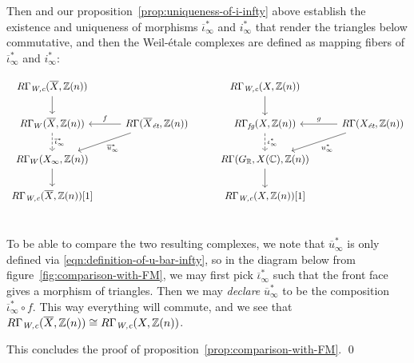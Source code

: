 \documentclass{article}
\numberwithin{equation}{section}
\begin{document}
Then \cite[Proposition~3.24]{Flach-Morin-2018} and our
proposition~\ref{prop:uniqueness-of-i-infty} above establish the existence and
uniqueness of morphisms $\overline{\iota}_\infty^*$ and $i_\infty^*$ that render
the triangles below commutative, and then the Weil-étale complexes are defined
as mapping fibers of $\overline{\iota}_\infty^*$ and $i_\infty^*$:

\[ \begin{tikzcd}
    R\Gamma_\Wc (\overline{X}, \ZZ (n))\ar{d} & & R\Gamma_\Wc (X, \ZZ (n))\ar{d} \\
    R\Gamma_W (\overline{X}, \ZZ(n)) \ar[dashed]{d}{\overline{\iota}_\infty^*} & R\Gamma (\overline{X}_\et, \ZZ(n)) \ar{dl}{\overline{u}_\infty^*}\ar{l}[swap]{f} & R\Gamma_\fg (X, \ZZ(n))  \ar[dashed]{d}{\iota_\infty^*} & R\Gamma (X_\et, \ZZ(n)) \ar{dl}{u_\infty^*}\ar{l}[swap]{g} \\
    R\Gamma_W (X_\infty, \ZZ (n))\ar{d} & & R\Gamma (G_\RR, X (\CC), \ZZ (n))\ar{d} \\
    R\Gamma_\Wc (\overline{X}, \ZZ (n))[1] & & R\Gamma_\Wc (X, \ZZ (n))[1] \\
  \end{tikzcd} \]

To be able to compare the two resulting complexes, we note that
$\overline{u}_\infty^*$ is only defined via
\eqref{eqn:definition-of-u-bar-infty}, so in the diagram below from
figure~\ref{fig:comparison-with-FM}, we may first pick
$\overline{\iota}_\infty^*$ such that the front face gives a morphism of
triangles. Then we may \emph{declare} $\overline{u}_\infty^*$ to be the
composition $\overline{\iota}_\infty^* \circ f$. This way everything will
commute, and we see that
$R\Gamma_{\text{\it W,c}} (\overline{X}, \mathbb{Z}(n)) \cong R\Gamma_{\text{\it W,c}} (X, \mathbb{Z}(n))$.

\vspace{1em}

This concludes the proof of proposition~\ref{prop:comparison-with-FM}. \qed
\end{document}
